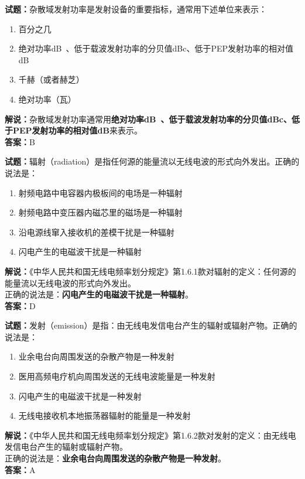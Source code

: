 \documentclass{ctexbook}
\begin{document}
\vspace{\baselineskip}

\noindent\textbf{试题：}杂散域发射功率是发射设备的重要指标，通常用下述单位来表示：
\begin{enumerate}[leftmargin=3em]
  \item 百分之几
  \item 绝对功率\unit[qualifier-mode=combine]{\deci\bel{}}、低于载波发射功率的分贝值dBc、低于PEP发射功率的相对值dB
  \item 千赫（或者赫芝）
  \item 绝对功率（瓦）
\end{enumerate}
\noindent\textbf{解说：}杂散域发射功率通常用\textbf{绝对功率\unit[qualifier-mode=combine]{\deci\bel{}}、低于载波发射功率的分贝值dBc、低于PEP发射功率的相对值dB}来表示。\\\noindent\textbf{答案：}B

\vspace{\baselineskip}

\noindent\textbf{试题：}辐射（radiation）是指任何源的能量流以无线电波的形式向外发出。正确的说法是：
\begin{enumerate}[leftmargin=3em]
  \item 射频电路中电容器内极板间的电场是一种辐射
  \item 射频电路中变压器内磁芯里的磁场是一种辐射
  \item 沿电源线窜入接收机的差模干扰是一种辐射
  \item 闪电产生的电磁波干扰是一种辐射
\end{enumerate}
\textbf{解说：}《中华人民共和国无线电频率划分规定》第1.6.1款对辐射的定义：任何源的能量流以无线电波的形式向外发出。\\正确的说法是：\textbf{闪电产生的电磁波干扰是一种辐射}。\\\noindent\textbf{答案：}D

\vspace{\baselineskip}

\noindent\textbf{试题：}发射（emission）是指：由无线电发信电台产生的辐射或辐射产物。正确的说法是：
\begin{enumerate}[leftmargin=3em]
  \item 业余电台向周围发送的杂散产物是一种发射
  \item 医用高频电疗机向周围发送的无线电波能量是一种发射
  \item 闪电产生的电磁波干扰是一种发射
  \item 无线电接收机本地振荡器辐射的能量是一种发射
\end{enumerate}
\noindent\textbf{解说：}《中华人民共和国无线电频率划分规定》第1.6.2款对发射的定义：由无线电发信电台产生的辐射或辐射产物。\\正确的说法是：\textbf{业余电台向周围发送的杂散产物是一种发射}。\\\noindent\textbf{答案：}A
\end{document}

